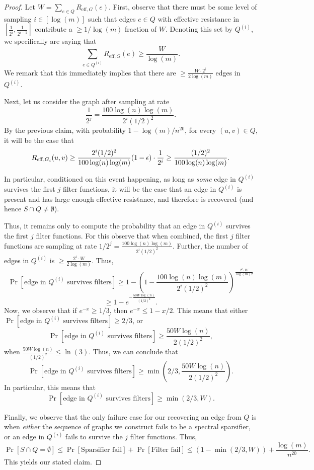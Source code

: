 \documentclass{article}
\begin{document}
\begin{proof}
    Let $W = \sum_{e \in Q} R_{\mathrm{eff}, G}(e)$. First, observe that there must be some level of sampling $i \in [\log(m)]$ such that edges $e \in Q$ with effective resistance in $[\frac{1}{2^{i}},\frac{1}{2^{i-1}}]$ contribute a $\geq 1 / \log(m)$ fraction of $W$. Denoting this set by $Q^{(i)}$, we specifically are saying that 
    \[
    \sum_{e \in Q^{(i)}} R_{\mathrm{eff}, G}(e) \geq \frac{W}{\log(m)}.
    \]
    We remark that this immediately implies that there are $\geq \frac{W \cdot 2^i}{2\log(m)}$ edges in $Q^{(i)}$.

    Next, let us consider the graph after sampling at rate 
    \[
    \frac{1}{2^j} = \frac{100 \log(n)\log(m)}{2^i (1/2)^2}.
    \]
    By the previous claim, with probability $1 - \log(m) / n^{20}$, for every $(u,v) \in Q$, it will be the case that 
    \[
    R_{\mathrm{eff}, G_i}(u,v) \geq \frac{2^i (1/2)^2}{100 \log(n)\log(m)} (1 - \epsilon) \cdot \frac{1}{2^i} \geq \frac{(1/2)^2}{100 \log(n) \log(m)}.
    \]

    In particular, conditioned on this event happening, as long as \emph{some} edge in $Q^{(i)}$ survives the first $j$ filter functions, it will be the case that an edge in $Q^{(i)}$ is present and has large enough effective resistance, and therefore is recovered (and hence $S \cap Q \neq \emptyset$).

    Thus, it remains only to compute the probability that an edge in $Q^{(i)}$ survives the first $j$ filter functions. For this observe that when combined, the first $j$ filter functions are sampling at rate $1 /2^j = \frac{100 \log(n)\log(m)}{2^i (1/2)^2}$. Further, the number of edges in $Q^{(i)}$ is $\geq \frac{2^i \cdot W}{2 \log(m)}$. Thus,
    \[
    \Pr[\text{edge in }Q^{(i)} \text{ survives filters}] \geq 1 - (1 - \frac{100 \log(n)\log(m)}{2^i (1/2)^2})^{\frac{2^i \cdot W}{\log(m) 2}}
    \]
    \[
    \geq 1 - e^{-\frac{50 W \log(n)}{(1/2)^2}}.
    \]
    Now, we observe that if $e^{-x} \geq 1/3$, then $e^{-x} \leq 1 - x/2$. This means that either $\Pr[\text{edge in }Q^{(i)} \text{ survives filters}] \geq 2/3$, or 
    \[
    \Pr[\text{edge in }Q^{(i)} \text{ survives filters}] \geq \frac{50 W \log(n)}{2(1/2)^2},
    \]
    when $\frac{50 W \log(n)}{(1/2)^2} \leq \ln(3)$. Thus, we can conclude that 
    \[
    \Pr[\text{edge in }Q^{(i)} \text{ survives filters}] \geq \min(2/3, \frac{50 W \log(n)}{2(1/2)^2}).
    \]
    In particular, this means that 
    \[
    \Pr[\text{edge in }Q^{(i)} \text{ survives filters}] \geq \min(2/3, W).
    \]

    Finally, we observe that the only failure case for our recovering an edge from $Q$ is when \emph{either} the sequence of graphs we construct fails to be a spectral sparsifier, or an edge in $Q^{(i)}$ fails to survive the $j$ filter functions. Thus, 
    \[
    \Pr[S \cap Q = \emptyset] \leq \Pr[\text{Sparsifier fail}] + \Pr[\text{Filter fail}] \leq (1 - \min(2/3, W)) + \frac{\log(m)}{n^{20}}.
    \]
    This yields our stated claim. 
\end{proof}
\end{document}
